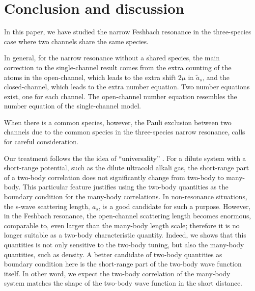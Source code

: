 \documentclass[reprint,pra]{revtex4-1}
\begin{document}
\section{Conclusion  and discussion\label{sec:conclusion}}
In this paper, we have studied the narrow Feshbach resonance in  the three-species case where two channels share the same species.  

In general, for the narrow resonance without a shared species, the main correction to the single-channel result comes from the  extra counting of the atoms in the open-channel, which leads to the extra shift $2\mu$ in $\tilde{a}_{s}$, and the closed-channel, which leads to the extra number equation.  Two number equations exist, one for each channel.  The open-channel number equation resembles the number equation of the single-channel model.

When there is a common species,  however, the  Pauli exclusion between two channels due to the common species in the three-species narrow resonance, calls for careful  consideration. 

  Our treatment follows the the  idea of ``universality'' \cite{Tan2008-1,shizhongUniv}.  For a dilute system with a short-range potential, such as the dilute ultracold alkali gas, the short-range part of a two-body correlation does not significantly change from two-body  to many-body.  This particular feature justifies using the two-body quantities  as the boundary condition for the many-body correlations.  In non-resonance situations, the s-wave scattering length, $a_s$, is a good candidate for such a purpose.  However, in the Feshbach resonance, the open-channel scattering length becomes enormous, comparable to, even larger than the many-body length scale; therefore it is no longer suitable as a two-body characteristic quantity.  Indeed, we shows that this quantities is not only sensitive to the two-body tuning, but also the many-body quantities, such as density.   A better candidate of two-body quantities as boundary condition here is the short-range part of the two-body wave function itself.  In other word, we expect the two-body correlation of the many-body system matches the shape of the two-body wave function in the short distance.  
  
\end{document}
